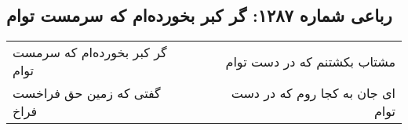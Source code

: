 \begin{center}
\section*{رباعی شماره ۱۲۸۷: گر کبر بخورده‌ام که سرمست توام}
\label{sec:1287}
\begin{longtable}{l p{0.5cm} r}
گر کبر بخورده‌ام که سرمست توام
&&
مشتاب بکشتنم که در دست توام
\\
گفتی که زمین حق فراخست فراخ
&&
ای جان به کجا روم که در دست توام
\\
\end{longtable}
\end{center}
